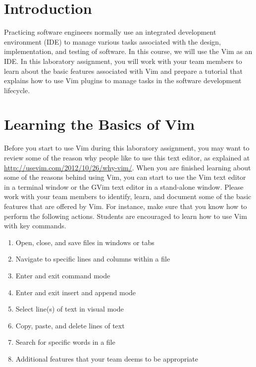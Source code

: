 

\usepackage[compact]{titlesec}



\section*{Introduction}

Practicing software engineers normally use an integrated development environment (IDE) to manage various tasks
associated with the design, implementation, and testing of software. In this course, we will use the Vim as an IDE.  In
this laboratory assignment, you will work with your team members to learn about the basic features associated with Vim
and prepare a tutorial that explains how to use Vim plugins to manage tasks in the software development lifecycle.

\section*{Learning the Basics of Vim}

Before you start to use Vim during this laboratory assignment, you may want to review some of the reason why people like
to use this text editor, as explained at \url{http://usevim.com/2012/10/26/why-vim/}.  When you are finished learning
about some of the reasons behind using Vim, you can start to use the Vim text editor in a terminal window or the GVim
text editor in a stand-alone window.  Please work with your team members to identify, learn, and document some of the
basic features that are offered by Vim.  For instance, make sure that you know how to perform the following actions.
Students are encouraged to learn how to use Vim with key commands.

\begin{enumerate}

	\item Open, close, and save files in windows or tabs

	\item Navigate to specific lines and columns within a file

	\item Enter and exit command mode

	\item Enter and exit insert and append mode

	\item Select line(s) of text in visual mode

	\item Copy, paste, and delete lines of text

	\item Search for specific words in a file 

	\item Additional features that your team deems to be appropriate

\end{enumerate}

